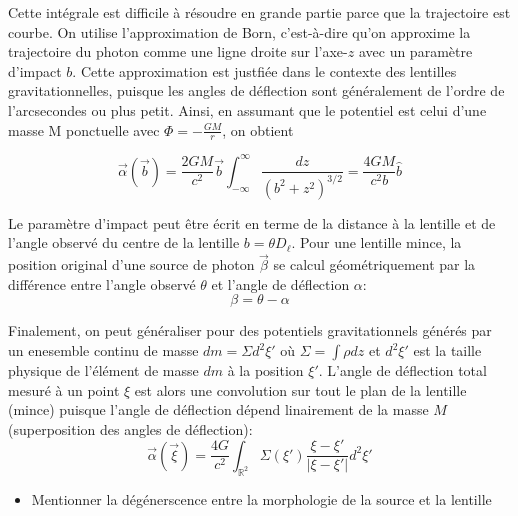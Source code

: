 Cette intégrale est difficile à résoudre en grande partie parce que la trajectoire est courbe. 
On utilise l'approximation de Born, c'est-à-dire qu'on approxime la trajectoire 
du photon comme une ligne droite sur l'axe-$z$ avec un paramètre d'impact $b$. Cette approximation est justfiée 
dans le contexte des lentilles gravitationnelles, puisque les angles de déflection sont généralement de 
l'ordre de l'arcsecondes ou plus petit. Ainsi, en assumant que le potentiel est celui d'une masse M
ponctuelle avec $\displaystyle \Phi = -\frac{GM}{r}$,
on obtient

\begin{equation}\label{eq:deflection approx}
        \vec{\alpha}(\vec{b}) = \frac{2GM}{c^{2}} \vec{b} \int_{-\infty }^{\infty } \frac{dz}{(b^{2} + z^{2})^{3/2}} 
        = \frac{4GM}{c^{2}b} \hat{b}
\end{equation} 

Le paramètre d'impact peut être écrit en terme de la distance à la lentille et de l'angle 
observé du centre de la lentille $b = \theta D_{\ell}$. Pour une lentille mince, 
la position original d'une source de photon $\vec{\beta}$ se calcul géométriquement 
par la différence entre l'angle observé $\theta$ et l'angle de déflection $\alpha$:
\begin{equation}\label{eq:equation lentille}
       \beta = \theta - \alpha 
\end{equation} 

Finalement, on peut généraliser pour des potentiels gravitationnels générés 
par un enesemble continu de masse $dm = \Sigma d^{2}\xi'$ où $\Sigma = \int \rho dz$ et 
$d^{2} \xi'$ est la taille physique de l'élément de masse $dm$ à la position $\xi'$. 
L'angle de déflection total mesuré à un point $\xi$ est alors une convolution 
sur tout le plan de la lentille (mince) puisque l'angle de déflection dépend 
linairement de la masse $M$ (superposition des angles de déflection):
\begin{equation}\label{eq:}
        \vec{\alpha}(\vec{\xi}) = \frac{4 G}{c^{2}} \int_{\mathbb{R}^{2}} \Sigma (\xi') \frac{\xi - \xi'}{|\xi - \xi'|}d^{2}\xi'
\end{equation} 
\begin{itemize}
        \item Mentionner la dégénerscence entre la morphologie de la source et la 
                lentille
\end{itemize}

